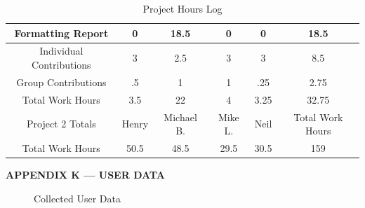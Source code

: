 \documentclass[conference]{IEEEtran}
\begin{document}
\begin{table}[H]
\begin{tabular}{| c | c | c | c | c | c |}
       \hline
       \rowcolor{blue!25} Formatting Report & 0 & 18.5 & 0 & 0 & 18.5\\
       \hline
       Individual Contributions & 3 & 2.5 & 3 & 3 & 8.5\\
       \hline
       \rowcolor{blue!25} Group Contributions & .5 & 1 & 1 & .25 & 2.75\\
       \hline
       Total Work Hours & 3.5 & 22 & 4 & 3.25 & 32.75\\
       \hline
       \rowcolor{blue!55} Project 2 Totals & Henry & Michael B. & Mike L. & Neil & Total Work Hours\\
       \hline
       Total Work Hours & 50.5 & 48.5 & 29.5 & 30.5 & 159\\
       \hline
     \end{tabular}
     \caption{Project Hours Log}
   \end{table}

 \newpage


 \hspace{.5 in} \textbf{APPENDIX K — USER DATA}

\vspace{5pt}

\begin{figure}[h!]
  \caption{Collected User Data}
  \label{fig:4}
\end{figure}
\vspace{-15pt}

\end{document}
